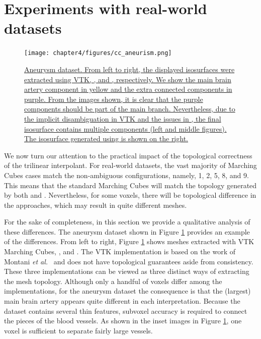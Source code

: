 

\section{Experiments with real-world datasets}

\begin{figure}
     \centering
     \texttt{[image: chapter4/figures/cc\_aneurism.png]}
     \caption{\href{http://dl.dropbox.com/u/8414964/C-MC33/webpage/figure8.html}{Aneurysm dataset. From left to right, the displayed isosurfaces were extracted using VTK, \mc, and \cmc, respectively. We show the main brain artery component in yellow and the extra connected components in purple. From the images shown, it is clear that the purple components should be part of the main branch. Nevertheless, due to the implicit disambiguation in VTK and the issues in \mc, the final isosurface contains multiple components (left and middle figures). The isosurface generated using \cmc{} is shown on the right. }}
     \label{fig:cc_aneurism}
\end{figure}

We now turn our attention to the practical impact of the topological correctness of the trilinear interpolant. 
For real-world datasets, the vast majority of Marching Cubes cases match the non-ambiguous configurations, namely, 1, 2, 5, 8, and 9. This means that the standard Marching Cubes will match the topology generated by both \mc{} and \cmc.
%
Nevertheless, for some voxels, there will be topological difference in the approaches, which may result in quite different meshes. 

For the sake of completeness, in this section we provide a qualitative analysis of these differences. The aneurysm dataset shown in Figure \ref{fig:cc_aneurism} provides an example of the differences. From left to right, Figure \ref{fig:cc_aneurism} shows meshes extracted with VTK Marching Cubes, \mc, and \cmc. The VTK implementation is based on the work of Montani \emph{et al.}~\cite{Montani:1994wp} and does not have topological guarantees aside from consistency. These three implementations can be viewed as three distinct ways of extracting the mesh topology.
%
Although only a handful of voxels differ among the implementations, for the aneurysm dataset the consequence is that the (largest) main brain artery appears quite different in each interpretation. Because the dataset contains several thin features, subvoxel accuracy is required to connect the pieces of the blood vessels. As shown in the inset images in Figure \ref{fig:cc_aneurism}, one voxel is sufficient to separate fairly large vessels.

